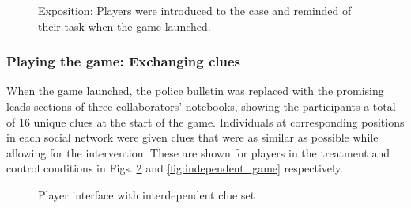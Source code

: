 \documentclass{article}
\begin{document}
\begin{figure}[h!]
\centering
{}
\caption{Exposition: Players were introduced to the case and reminded of their task when the game launched.}
\label{fig:exposition}
\end{figure}

\subsubsection{Playing the game: Exchanging clues}
When the game launched, the police bulletin was replaced with the promising leads sections of three collaborators’ notebooks, showing the participants a total of 16 unique clues at the start of the game. Individuals at corresponding positions in each social network were given clues that were as similar as possible while allowing for the intervention. These are shown for players in the treatment and control conditions in Figs. \ref{fig:interdependent_game} and \ref{fig:independent_game} respectively.

\begin{figure}[h!]
\centering
{}
\caption{Player interface with interdependent clue set}
\label{fig:interdependent_game}
\end{figure}
\end{document}
